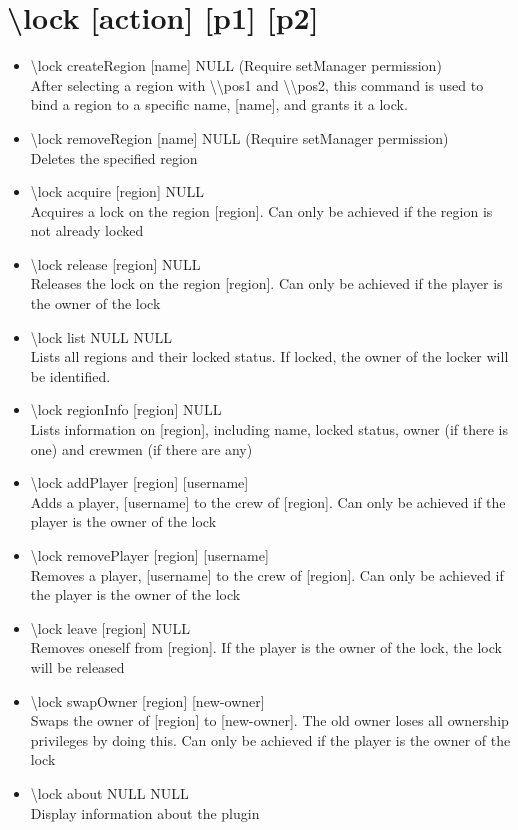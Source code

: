 \documentclass[a4paper,twoside,notitlepage,11pt]{article}
\begin{document}
\section{\textbackslash lock [action] [p1] [p2]}
\begin{itemize}
\item \textbackslash lock createRegion [name] NULL (Require setManager permission)\\
After selecting a region with \textbackslash\textbackslash pos1 and \textbackslash\textbackslash pos2, this command is used to bind a region to a specific name, [name], and grants it a lock.
\item \textbackslash lock removeRegion [name] NULL (Require setManager permission)\\
Deletes the specified region
\item \textbackslash lock acquire [region] NULL\\
Acquires a lock on the region [region]. Can only be achieved if the region is not already locked
\item \textbackslash lock release [region] NULL\\
Releases the lock on the region [region]. Can only be achieved if the player is the owner of the lock
\item \textbackslash lock list NULL NULL\\
Lists all regions and their locked status. If locked, the owner of the locker will be identified.
\item \textbackslash lock regionInfo [region] NULL\\
Lists information on [region], including name, locked status, owner (if there is one) and crewmen (if there are any)
\item \textbackslash lock addPlayer [region] [username]\\
Adds a player, [username] to the crew of [region]. Can only be achieved if the player is the owner of the lock
\item \textbackslash lock removePlayer [region] [username]\\
Removes a player, [username] to the crew of [region]. Can only be achieved if the player is the owner of the lock
\item \textbackslash lock leave [region] NULL\\
Removes oneself from [region]. If the player is the owner of the lock, the lock will be released
\item \textbackslash lock swapOwner [region] [new-owner]\\
Swaps the owner of [region] to [new-owner]. The old owner loses all ownership privileges by doing this. Can only be achieved if the player is the owner of the lock
\item \textbackslash lock about NULL NULL \\
Display information about the plugin
\end{itemize}
\end{document}

